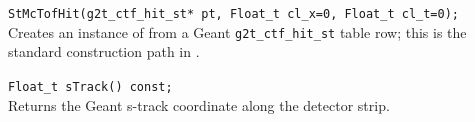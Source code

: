 \begin{Entry}
    \verb+StMcTofHit(g2t_ctf_hit_st* pt, Float_t cl_x=0, Float_t cl_t=0);+\\
    Creates an instance of  from a Geant
    \texttt{g2t\_ctf\_hit\_st} table row; this is the standard
    construction path in .

\item[Public Member\\ Functions]
    \verb+Float_t sTrack() const;+\\
    Returns the Geant s-track coordinate along the detector strip.

\end{Entry}
\clearpage

%
%
